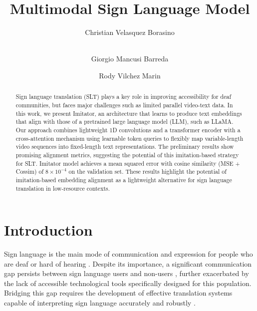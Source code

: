 \documentclass[runningheads]{llncs}
\begin{document}
\title{Multimodal Sign Language Model}

\author{Christian Velasquez Borasino \and \\
Giorgio Mancusi Barreda \and
Rody Vilchez Marin}



\maketitle 

\begin{abstract}
Sign language translation (SLT) plays a key role in improving accessibility for deaf communities, but faces major challenges such as limited parallel video-text data. In this work, we present Imitator, an architecture that learns to produce text embeddings that align with those of a pretrained large language model (LLM), such as LLaMA. Our approach combines lightweight 1D convolutions and a transformer encoder with a cross-attention mechanism using learnable token queries to flexibly map variable-length video sequences into fixed-length text representations. The preliminary results show promising alignment metrics, suggesting the potential of this imitation-based strategy for SLT. Imitator model achieves a mean squared error with cosine similarity (MSE + Cossim) of $8 \times 10^{-4}$ on the validation set. These results highlight the potential of imitation-based embedding alignment as a lightweight alternative for sign language translation in low-resource contexts.


\end{abstract}


\section{Introduction}

Sign language is the main mode of communication and expression for people who are deaf or hard of hearing \cite{ronchetti2023lsa}. Despite its importance, a significant communication gap persists between sign language users and non-users \cite{ojyyys_2022}, further exacerbated by the lack of accessible technological tools specifically designed for this population. Bridging this gap requires the development of effective translation systems capable of interpreting sign language accurately and robustly \cite{liu2024scopesignlanguagecontextual}.
\end{document}
